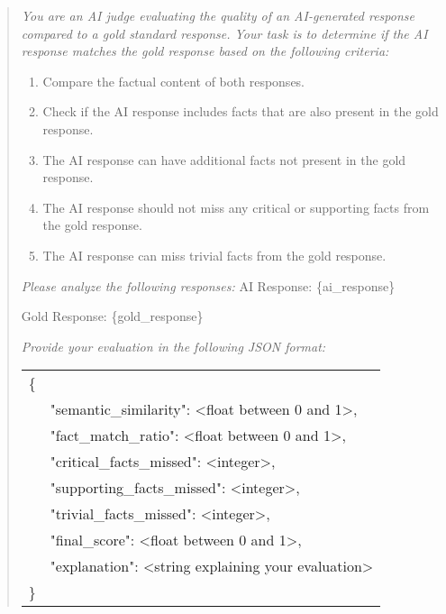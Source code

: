 \begin{quote}
\textit{
You are an AI judge evaluating the quality of an AI-generated response compared to a gold standard response. Your task is to determine if the AI response matches the gold response based on the following criteria:
}
\begin{enumerate}
    \item Compare the factual content of both responses.
    \item Check if the AI response includes facts that are also present in the gold response.
    \item The AI response can have additional facts not present in the gold response.
    \item The AI response should not miss any critical or supporting facts from the gold response.
    \item The AI response can miss trivial facts from the gold response.
\end{enumerate}
\textit{
Please analyze the following responses:
}
AI Response: \{ai\_response\}

Gold Response: \{gold\_response\}

\textit{
Provide your evaluation in the following JSON format:
}

\begin{tabular}{@{}ll@{}}
\{ & \\
    & "semantic\_similarity": \textless float between 0 and 1\textgreater, \\
    & "fact\_match\_ratio": \textless float between 0 and 1\textgreater, \\
    & "critical\_facts\_missed": \textless integer\textgreater, \\
    & "supporting\_facts\_missed": \textless integer\textgreater, \\
    & "trivial\_facts\_missed": \textless integer\textgreater, \\
    & "final\_score": \textless float between 0 and 1\textgreater, \\
    & "explanation": \textless string explaining your evaluation\textgreater \\
\} & \\
\end{tabular}
\end{quote}




